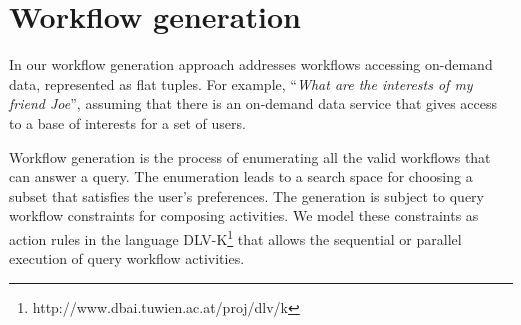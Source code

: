 

\section{Workflow generation} \label{sec:queryWorkflowGen}
 
In our workflow generation approach addresses workflows accessing on-demand data, represented as flat tuples. For example, ``\textit{What are the interests of my friend Joe}'', assuming that there is an on-demand data service that gives access to a base of interests for a set of users.

Workflow generation is the process of enumerating all the valid workflows that can answer a query. The enumeration leads to a search space for choosing a subset that satisfies the user's preferences. The generation is subject to query workflow constraints for composing activities. We model these constraints as action rules in the language DLV-K\footnote{http://www.dbai.tuwien.ac.at/proj/dlv/k} that allows the sequential or parallel execution of query workflow activities.
         

